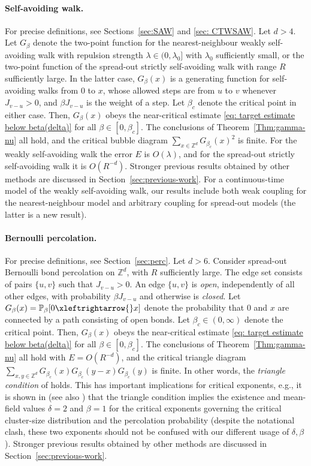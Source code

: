 \documentclass[11pt,a4paper]{article}
\numberwithin{equation}{section}
\theoremstyle{plain}
\theoremstyle{definition}
\newcommand\1{\mathds{1}}
\newcommand{\connect}{\xleftrightarrow}
\begin{document}
\paragraph{Self-avoiding walk.}
For precise definitions, see Sections~\ref{sec:SAW} and \ref{sec: CTWSAW}.  Let $d>4$.
Let $G_\beta$ denote the two-point function for the
nearest-neighbour weakly self-avoiding walk with repulsion strength
$\lambda\in (0,\lambda_0]$ with $\lambda_0$ sufficiently small,
or the two-point function of the spread-out strictly self-avoiding
walk with range $R$ sufficiently large.
In the latter case, $G_\beta(x)$ is a generating function for self-avoiding
walks from $0$ to $x$, whose allowed steps are from $u$ to $v$ whenever $J_{v-u}>0$,
and $\beta J_{v-u}$ is the weight of a step.
Let $\beta_c$ denote
the critical point in either case.  Then, $G_\beta(x)$ obeys the near-critical
estimate \eqref{eq: target estimate below beta(delta)} for all $\beta \in [0,\beta_c]$.
The conclusions of Theorem~\ref{Thm:gamma-nu} all hold, and the critical bubble
diagram $\sum_{x\in \mathbb Z^d}G_{\beta_c}(x)^2$ is finite.
For the weakly self-avoiding walk the error $E$ is $O(\lambda)$, and for the spread-out
strictly self-avoiding walk it is $O(R^{-d})$.
Stronger previous results obtained by other methods are discussed in
Section~\ref{sec:previous-work}.
For a continuous-time model of the weakly self-avoiding walk, our results
include both weak coupling for the nearest-neighbour model and arbitrary coupling
for spread-out models (the latter is a new result).

\paragraph{Bernoulli percolation.}
For precise definitions, see Section~\ref{sec:perc}.  Let $d>6$.
Consider spread-out Bernoulli bond percolation on $\mathbb Z^d$, with
$R$ sufficiently large. The edge set consists
of pairs $\{u,v\}$ such that $J_{v-u}>0$.   An edge $\{u,v\}$ is \emph{open}, independently of all other edges, with probability
$\beta J_{v-u}$ and otherwise is \emph{closed}.  Let
$G_\beta(x) = \mathbb P_\beta[0 \connect{} x]$ denote the probability that $0$ and
$x$ are connected by a path consisting of open bonds.
Let $\beta_c\in (0,\infty)$ denote
the critical point.  Then, $G_\beta(x)$ obeys the near-critical
estimate \eqref{eq: target estimate below beta(delta)} for all $\beta \in [0,\beta_c]$.
The conclusions of Theorem~\ref{Thm:gamma-nu} all hold
with $E=O(R^{-d})$, and the critical triangle
diagram $\sum_{x,y\in \mathbb Z^d}G_{\beta_c}(x)G_{\beta_c}(y-x) G_{\beta_c}(y)$ is finite.
In other words, the \emph{triangle condition} of \cite{AN84} holds.
This has important implications for critical exponents, e.g., it is shown
in \cite{BA91} (see also \cite{Hutc22}) that the triangle condition implies the existence and mean-field
values $\delta=2$ and $\beta=1$ for the critical exponents governing
the critical cluster-size distribution and
the percolation probability (despite the notational clash, these two exponents should not
be confused with our different usage of $\delta,\beta$).
Stronger previous results obtained by other methods are discussed in
Section~\ref{sec:previous-work}.
\end{document}
